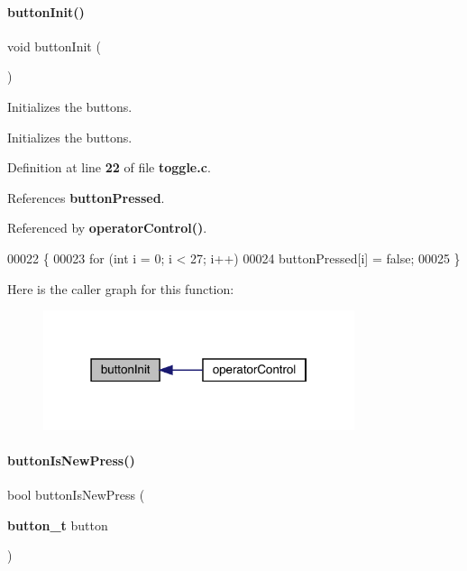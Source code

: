 \paragraph{button\+Init()}
{\footnotesize\ttfamily void button\+Init (\begin{DoxyParamCaption}{ }\end{DoxyParamCaption})}



Initializes the buttons. 

Initializes the buttons. 

Definition at line \textbf{ 22} of file \textbf{ toggle.\+c}.



References \textbf{ button\+Pressed}.



Referenced by \textbf{ operator\+Control()}.


\begin{DoxyCode}
00022                   \{
00023   \textcolor{keywordflow}{for} (\textcolor{keywordtype}{int} i = 0; i < 27; i++)
00024     buttonPressed[i] = \textcolor{keyword}{false};
00025 \}
\end{DoxyCode}
Here is the caller graph for this function\+:
\nopagebreak
\begin{figure}[H]
\begin{center}
\leavevmode
\includegraphics[width=259pt]{toggle_8h_a2b3d226371575c894979ab84bce95626_icgraph}
\end{center}
\end{figure}
\mbox{\label{toggle_8h_ae819f86fad1b51d66f4294140b53ff77}} 
\paragraph{button\+Is\+New\+Press()}
{\footnotesize\ttfamily bool button\+Is\+New\+Press (\begin{DoxyParamCaption}\item[{\textbf{ button\+\_\+t}}]{button }\end{DoxyParamCaption})}



